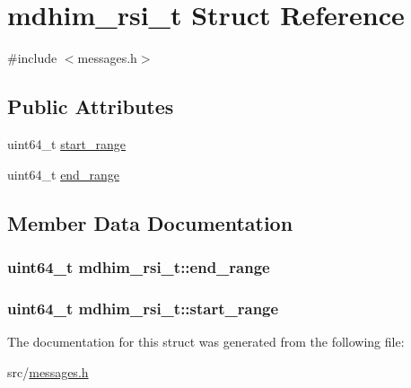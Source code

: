 \hypertarget{structmdhim__rsi__t}{\section{mdhim\-\_\-rsi\-\_\-t Struct Reference}
\label{df/dcf/structmdhim__rsi__t}
}


{\ttfamily \#include $<$messages.\-h$>$}

\subsection*{Public Attributes}
\begin{DoxyCompactItemize}
\item 
uint64\-\_\-t \hyperlink{structmdhim__rsi__t_a061357aa54194aea3b1e0c625152e702}{start\-\_\-range}
\item 
uint64\-\_\-t \hyperlink{structmdhim__rsi__t_a0898c4dff1ef24303bd94aac3a56abf5}{end\-\_\-range}
\end{DoxyCompactItemize}


\subsection{Member Data Documentation}
\hypertarget{structmdhim__rsi__t_a0898c4dff1ef24303bd94aac3a56abf5}{
\subsubsection[{end\-\_\-range}]{\setlength{\rightskip}{0pt plus 5cm}uint64\-\_\-t mdhim\-\_\-rsi\-\_\-t\-::end\-\_\-range}}\label{df/dcf/structmdhim__rsi__t_a0898c4dff1ef24303bd94aac3a56abf5}
\hypertarget{structmdhim__rsi__t_a061357aa54194aea3b1e0c625152e702}{
\subsubsection[{start\-\_\-range}]{\setlength{\rightskip}{0pt plus 5cm}uint64\-\_\-t mdhim\-\_\-rsi\-\_\-t\-::start\-\_\-range}}\label{df/dcf/structmdhim__rsi__t_a061357aa54194aea3b1e0c625152e702}


The documentation for this struct was generated from the following file\-:\begin{DoxyCompactItemize}
\item 
src/\hyperlink{messages_8h}{messages.\-h}\end{DoxyCompactItemize}
